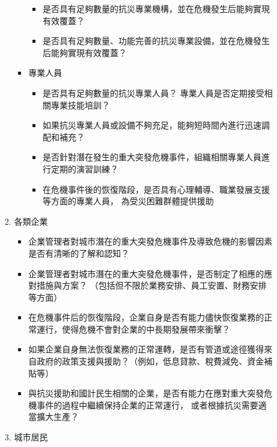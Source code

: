 \documentclass[a4paper,12pt]{article}
\begin{document}
\begin{enumerate}
\begin{enumerate}
\begin{enumerate}
\begin{itemize}
\begin{itemize}
\item 是否具有足夠數量的抗災專業機構，並在危機發生后能夠實現有效覆蓋？\\
\item 是否具有足夠數量、功能完善的抗災專業設備，並在危機發生后能夠實現有效覆蓋？\\
\end{itemize}
\item 專業人員
\label{sec:orge3561ee}
\begin{itemize}
\item 是否具有足夠數量的抗災專業人員？ 專業人員是否定期接受相關專業技能培訓？\\
\item 如果抗災專業人員或設備不夠充足，能夠短時間內進行迅速調配和補充？\\
\item 是否針對潛在發生的重大突發危機事件，組織相關專業人員進行定期的演習訓練？\\
\item 在危機事件後的恢復階段，是否具有心理輔導、職業發展支援等方面的專業人員， 為受災困難群體提供援助\\
\end{itemize}
\end{itemize}
\item 各類企業
\label{sec:org0857556}
\begin{itemize}
\item 企業管理者對城市潛在的重大突發危機事件及導致危機的影響因素是否有清晰的了解和認知？\\
\item 企業管理者對城市潛在的重大突發危機事件，是否制定了相應的應對措施與方案？ （包括但不限於業務安排、員工安置、財務安排等方面）\\
\item 在危機事件后的恢復階段，企業自身是否有能力儘快恢復業務的正常運行，使得危機不會對企業的中長期發展帶來衝擊？\\
\item 如果企業自身無法恢復業務的正常運轉，是否有管道或途徑獲得來自政府的政策支援與援助？（例如，低息貸款、稅費減免、資金補貼等）\\
\item 與抗災援助和國計民生相關的企業，是否有能力在應對重大突發危機事件的過程中繼續保持企業的正常運行， 或者根據抗災需要適當擴大生產？\\
\end{itemize}
\item 城市居民
\label{sec:org3be18a6}
\begin{itemize}

\end{itemize}
\end{enumerate}
\end{enumerate}
\end{enumerate}
\end{document}
